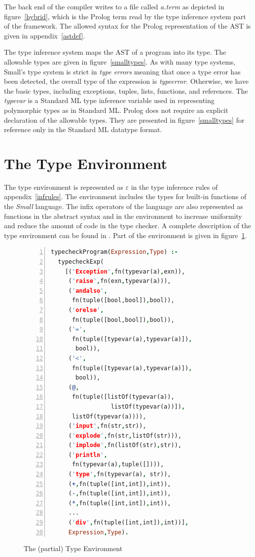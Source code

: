 \documentclass[10pt]{luthercs}
\begin{document}
The back end of the compiler writes to a file called {\em a.term} as depicted in figure~\ref{hybrid}, which is the Prolog term read by the type inference system part of the framework. The allowed syntax for the Prolog representation of the AST is given in appendix~\ref{astdef}. 

The type inference system maps the AST of a program into its type. The allowable types are given in figure~\ref{smalltypes}. As with many type systems, Small's type system is strict in {\em type errors} meaning that once a type error has been detected, the overall type of the expression is {\em typeerror}. Otherwise, we have the basic types, including exceptions, tuples, lists, functions, and references. The {\em typevar} is a Standard ML type inference variable used in representing polymorphic types as in Standard ML. Prolog does not require an explicit declaration of the allowable types. They are presented in figure~\ref{smalltypes} for reference only in the Standard ML datatype format. 

\section{The Type Environment}

The type environment is represented as $\varepsilon$ in the type inference rules of appendix~\ref{infrules}. The environment includes the types for built-in functions of the {\em Small} language. The infix operators of the language are also represented as functions in the abstract syntax and in the environment to increase uniformity and reduce the amount of code in the type checker. A complete description of the type environment can be found in \cite{leepl}. Part of the environment is given in figure~\ref{typeenv}.

\begin{figure}[htbp]
\begin{lstlisting}[language=Prolog,numbers=left,numberstyle=\tiny]
typecheckProgram(Expression,Type) :- 
  typecheckExp(
    [('Exception',fn(typevar(a),exn)),
     ('raise',fn(exn,typevar(a))),
     ('andalso',
      fn(tuple([bool,bool]),bool)),
     ('orelse',
      fn(tuple([bool,bool]),bool)),
     ('=', 
      fn(tuple([typevar(a),typevar(a)]),
       bool)),
     ('<', 
      fn(tuple([typevar(a),typevar(a)]),
       bool)),
     (@,
      fn(tuple([listOf(typevar(a)),
                 listOf(typevar(a))]),
      listOf(typevar(a)))),
     ('input',fn(str,str)),
     ('explode',fn(str,listOf(str))),
     ('implode',fn(listOf(str),str)),
     ('println',
      fn(typevar(a),tuple([]))),
     ('type',fn(typevar(a), str)),
     (+,fn(tuple([int,int]),int)),
     (-,fn(tuple([int,int]),int)),
     (*,fn(tuple([int,int]),int)),
     ...
     ('div',fn(tuple([int,int]),int))],
     Expression,Type).
\end{lstlisting}
\caption{The (partial) Type Environment}
\label{typeenv}
\end{figure}
\end{document}
